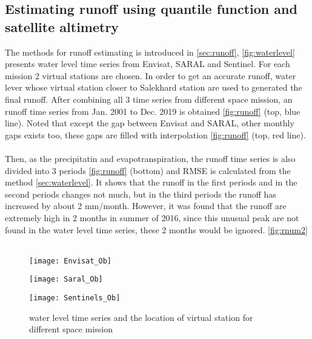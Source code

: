 \subsection{Estimating runoff using quantile function and satellite altimetry}
 The methods for runoff estimating is introduced in \autoref{sec:runoff}, \autoref{fig:waterlevel} presents water level time series from Envisat, SARAL and Sentinel. For each mission 2 virtual stations are chosen. In order to get an accurate runoff, water lever whose virtual station closer to Salekhard station are used to generated the final runoff. After combining all 3 time series from different space mission, an runoff time series from Jan. 2001 to Dec. 2019 is obtained \autoref{fig:runoff} (top, blue line). Noted that except the gap between Envisat and SARAL, other monthly gaps exists too, these gaps are filled with interpolation \autoref{fig:runoff} (top, red line). \\\\
 Then, as the precipitatin and evapotranspiration, the runoff time series is also divided into 3 periods \autoref{fig:runoff} (bottom) and RMSE is calculated from the method \autoref{sec:waterlevel}. It shows that the runoff in the first periods and in the second periods changes not much, but in the third periods the runoff has increased by about 2 mm/month. However, it was found that the runoff are extremely high in 2 months in summer of 2016, since this unusual peak are not found in the water level time series, these 2 months would be ignored. \ref{fig:rnum2} \\\\
 \begin{figure}[htbp]
 	\centering
 	\begin{minipage}[t]{0.7\textwidth}
 		\centering
 		\texttt{[image: Envisat\_Ob]} %
 	\end{minipage}
 	\begin{minipage}[t]{0.7\textwidth}
 		\centering
 		\texttt{[image: Saral\_Ob]} %
 	\end{minipage}
 \begin{minipage}[t]{0.7\textwidth}
 	\centering
 	\texttt{[image: Sentinels\_Ob]} %
 \end{minipage}
 \caption{water level time series and the location of virtual station for different space mission}
 \label{fig:waterlevel}
 \end{figure}
